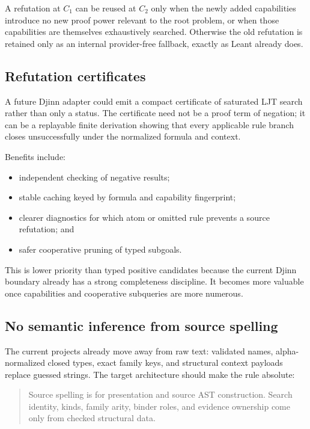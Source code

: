 \documentclass[11pt]{article}
\newcommand{\Leant}{\textsf{Leant}}
\newcommand{\Djinn}{Djinn}
\begin{document}
A refutation at \(C_1\) can be reused at \(C_2\) only when the newly added
capabilities introduce no new proof power relevant to the root problem, or when
those capabilities are themselves exhaustively searched.  Otherwise the old
refutation is retained only as an internal provider-free fallback, exactly as
\Leant{} already does.

\subsection{Refutation certificates}

A future \Djinn{} adapter could emit a compact certificate of saturated LJT
search rather than only a status.  The certificate need not be a proof term of
negation; it can be a replayable finite derivation showing that every applicable
rule branch closes unsuccessfully under the normalized formula and context.

Benefits include:

\begin{itemize}
  \item independent checking of negative results;
  \item stable caching keyed by formula and capability fingerprint;
  \item clearer diagnostics for which atom or omitted rule prevents a source
    refutation; and
  \item safer cooperative pruning of typed subgoals.
\end{itemize}

This is lower priority than typed positive candidates because the current
\Djinn{} boundary already has a strong completeness discipline.  It becomes
more valuable once capabilities and cooperative subqueries are more numerous.

\subsection{No semantic inference from source spelling}

The current projects already move away from raw text: validated names,
alpha-normalized closed types, exact family keys, and structural context
payloads replace guessed strings.  The target architecture should make the
rule absolute:

\begin{quote}
Source spelling is for presentation and source AST construction.  Search
identity, kinds, family arity, binder roles, and evidence ownership come only
from checked structural data.
\end{quote}
\end{document}

